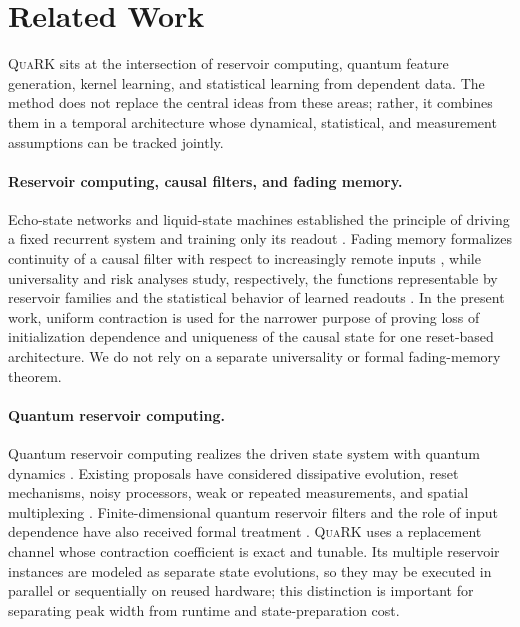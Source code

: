 \section{Related Work}
\label{sec:related-work}

\textsc{QuaRK} sits at the intersection of reservoir computing, quantum
feature generation, kernel learning, and statistical learning from dependent
data. The method does not replace the central ideas from these areas; rather,
it combines them in a temporal architecture whose dynamical, statistical, and
measurement assumptions can be tracked jointly.

\paragraph{Reservoir computing, causal filters, and fading memory.}
Echo-state networks and liquid-state machines established the principle of
driving a fixed recurrent system and training only its readout
\citep{Jaeger2001,MaassNatschlagerMarkram2002}. Fading memory formalizes
continuity of a causal filter with respect to increasingly remote inputs
\citep{BoydChua1985}, while universality and risk analyses study, respectively,
the functions representable by reservoir families and the statistical
behavior of learned readouts
\citep{GrigoryevaOrtega2018,GononGrigoryevaOrtega2020}. In the present work,
uniform contraction is used for the narrower purpose of proving loss of
initialization dependence and uniqueness of the causal state for one
reset-based architecture. We do not rely on a separate universality or formal
fading-memory theorem.

\paragraph{Quantum reservoir computing.}
Quantum reservoir computing realizes the driven state system with quantum
dynamics \citep{FujiiNakajima2017}. Existing proposals have considered
dissipative evolution, reset mechanisms, noisy processors, weak or repeated
measurements, and spatial multiplexing
\citep{ChenNurdin2019,ChenNurdinYamamoto2020,NakajimaEtAl2019,
MolteniDestriPrati2023,MujalEtAl2023,HuEtAl2024}. Finite-dimensional quantum
reservoir filters and the role of input dependence have also received formal
treatment \citep{MartinezPenaOrtega2023}. \textsc{QuaRK} uses a replacement
channel whose contraction coefficient is exact and tunable. Its multiple
reservoir instances are modeled as separate state evolutions, so they may be
executed in parallel or sequentially on reused hardware; this distinction is
important for separating peak width from runtime and state-preparation cost.

